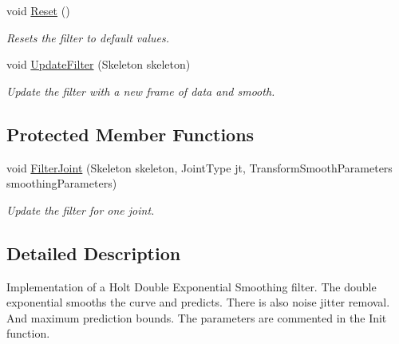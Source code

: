 \begin{DoxyCompactItemize}
void \hyperlink{class_microsoft_1_1_samples_1_1_kinect_1_1_avateering_1_1_filters_1_1_skeleton_joints_position_double_exponential_filter_a63907db70c589d23fe7302456ab58fe1}{Reset} ()
\begin{DoxyCompactList}\small\item\em Resets the filter to default values. \end{DoxyCompactList}\item 
void \hyperlink{class_microsoft_1_1_samples_1_1_kinect_1_1_avateering_1_1_filters_1_1_skeleton_joints_position_double_exponential_filter_a1853f70c62337ea0d07e4d590a06d5ab}{Update\+Filter} (Skeleton skeleton)
\begin{DoxyCompactList}\small\item\em Update the filter with a new frame of data and smooth. \end{DoxyCompactList}\end{DoxyCompactItemize}
\subsection*{Protected Member Functions}
\begin{DoxyCompactItemize}
\item 
void \hyperlink{class_microsoft_1_1_samples_1_1_kinect_1_1_avateering_1_1_filters_1_1_skeleton_joints_position_double_exponential_filter_acb576687a841dfb4d89b219bae4b6897}{Filter\+Joint} (Skeleton skeleton, Joint\+Type jt, Transform\+Smooth\+Parameters smoothing\+Parameters)
\begin{DoxyCompactList}\small\item\em Update the filter for one joint. \end{DoxyCompactList}\end{DoxyCompactItemize}


\subsection{Detailed Description}
Implementation of a Holt Double Exponential Smoothing filter. The double exponential smooths the curve and predicts. There is also noise jitter removal. And maximum prediction bounds. The parameters are commented in the Init function. 



